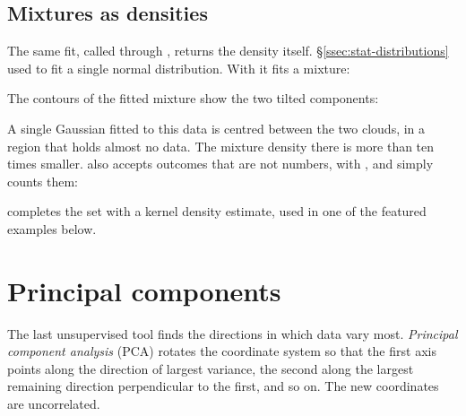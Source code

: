 \subsection{Mixtures as densities}
\label{ssec:ml-density}

The same fit, called through , returns the density itself.
\S\ref{ssec:stat-distributions} used  to fit a single normal
distribution. With  it fits a mixture:

\begin{codepairs}
\end{codepairs}

The contours of the fitted mixture show the two tilted components:


A single Gaussian fitted to this data is centred between the two clouds, in a
region that holds almost no data. The mixture density there is more than ten times
smaller.  also accepts outcomes that are not numbers, with
, and simply counts them:

\begin{codepairs}
\end{codepairs}

 completes the set with a kernel density estimate,
used in one of the featured examples below.

\section{Principal components}
\label{sec:ml-pca}

The last unsupervised tool finds the directions in which data vary most.
\emph{Principal component analysis} (PCA)
rotates the coordinate system so that the first axis points along the direction of
largest variance, the second along the largest remaining direction perpendicular to
the first, and so on. The new coordinates are uncorrelated.

